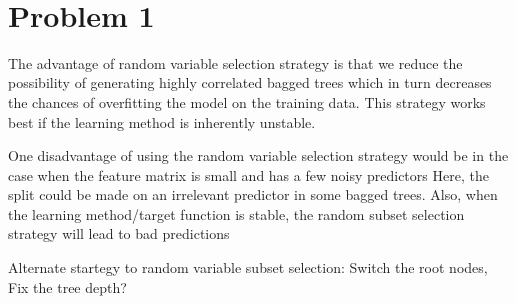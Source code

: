 \documentclass[11pt]{article}
\begin{document}
\begin{center}

\ \\
\end{center}

\section*{Problem 1}

\vspace{5 mm}
\noindent
The advantage of random variable selection strategy is that we reduce the
possibility of generating highly correlated bagged trees which in turn 
decreases the chances of overfitting the model on the training data. This
strategy works best if the learning method is inherently unstable.

One disadvantage of using the random variable selection strategy would be 
in the case when the feature matrix is small and has a few noisy predictors
Here, the split could be made on an irrelevant predictor in some bagged trees.
Also, when the learning method/target function is stable, the random subset
selection strategy will lead to bad predictions

Alternate startegy to random variable subset selection: Switch the root nodes,
Fix the tree depth?


\vspace{5 mm}
\noindent
\end{document}
